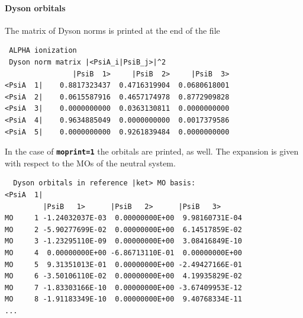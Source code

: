 \documentclass[a4paper,10pt,DIV=15,openany]{scrbook}
\newcommand{\ttt}[1]{\textbf{\texttt{#1}}}
\newenvironment{example}{
  \setlength{\OuterFrameSep}{3pt}
  \vspace{0mm}
  \definecolor{shadecolor}{HTML}{E4F4FF}
  \begin{shaded}
}{
  \end{shaded}
}
\begin{document}
\paragraph{Dyson orbitals}
The matrix of Dyson norms is printed at the end of the file

\begin{example}
\begin{verbatim}
 ALPHA ionization
 Dyson norm matrix |<PsiA_i|PsiB_j>|^2                                          
                |PsiB  1>     |PsiB  2>     |PsiB  3>                           
<PsiA  1|    0.8817323437  0.4716319904  0.0680618001                           
<PsiA  2|    0.0615587916  0.4657174978  0.8772909828                           
<PsiA  3|    0.0000000000  0.0363130811  0.0000000000                           
<PsiA  4|    0.9634885049  0.0000000000  0.0017379586                           
<PsiA  5|    0.0000000000  0.9261839484  0.0000000000 
\end{verbatim}
\end{example}

In the case of \ttt{moprint=1} the orbitals are printed, as well.
The expansion is given with respect to the MOs of the neutral system.
%
\begin{example}
\begin{verbatim}
  Dyson orbitals in reference |ket> MO basis:                                   
<PsiA  1|                                                                       
         |PsiB   1>      |PsiB   2>      |PsiB   3>                             
MO     1 -1.24032037E-03  0.00000000E+00  9.98160731E-04                        
MO     2 -5.90277699E-02  0.00000000E+00  6.14517859E-02                        
MO     3 -1.23295110E-09  0.00000000E+00  3.08416849E-10                        
MO     4  0.00000000E+00 -6.86713110E-01  0.00000000E+00                        
MO     5  9.31351013E-01  0.00000000E+00 -2.49427166E-01                        
MO     6 -3.50106110E-02  0.00000000E+00  4.19935829E-02
MO     7 -1.83303166E-10  0.00000000E+00 -3.67409953E-12                        
MO     8 -1.91183349E-10  0.00000000E+00  9.40768334E-11 
...
\end{verbatim}
\end{example}
%
\end{document}
